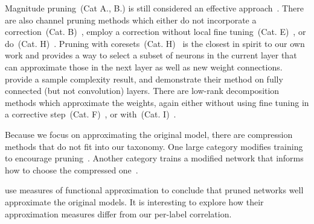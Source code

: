 Magnitude pruning~(Cat A., B.) is still considered an effective approach~\cite{blalock2020state,frankle2018lottery,frankle2020pruning,gale2019state,liu2019rethink,li2017l1}. 
There are also channel pruning methods which either do not incorporate a correction~(Cat. B)~\cite{he2019fpgm,luo2017thinet}, employ a correction without local fine tuning~(Cat. E)~\cite{liebenwein2020provable,he2018amc}, or do~(Cat. H)~\cite{luo2017thinet,he2017feat,zhuang2018dcp,peng2019ccp,liu2017netslim}. 
Pruning with coresets~(Cat. H)~\cite{mussay2020coreset} is the closest in spirit to our own work and provides a way to select a subset of neurons in the current layer that can approximate those in the next layer as well as new weight connections.
\citet{mussay2020coreset} provide a sample complexity result,
and demonstrate their method on fully connected (but not convolution) layers.
There are low-rank decomposition methods which approximate the weights, again either without using fine tuning in a corrective step~(Cat. F)~\cite{denten2014svd,lebedev2015cpdecomp}, or with~(Cat. I)~\cite{zhang20153dfilter,idel2020lrank,liebenwein2021alds,jarderberg2014lowrank,peng2018group}.



Because we focus on approximating the original model, there are compression methods that do not fit into our taxonomy.
One large category modifies training to encourage pruning~\cite{huang2018sss,yang2020hoyer,alvarez2017compressaware,wen2017coord,zhuang2020polar}.
Another category trains a modified network that informs how to choose the compressed one~\cite{liu2019meta,chen2021once}.


\citet{liebenwein2021lost} use measures of functional approximation to conclude that pruned networks well approximate the original models. It is interesting to explore how their approximation measures differ from our per-label correlation.



